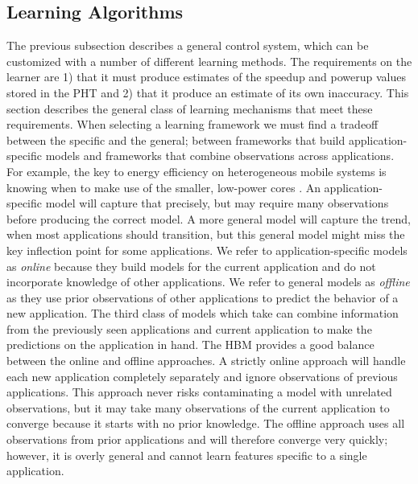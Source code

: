 \subsection{\SYSTEM{} Learning Algorithms}
The previous subsection describes a general control system, which can
be customized with a number of different learning methods.  The
requirements on the learner are 1) that it must produce estimates of
the speedup and powerup values stored in the PHT and 2) that it
produce an estimate of its own inaccuracy. 
This section describes the
general class of learning mechanisms that meet these requirements. When selecting a learning framework we must find a tradeoff between
the specific and the general; \ie between frameworks that build
application-specific models and frameworks that combine observations
across applications.  For example, the key to energy efficiency on
heterogeneous mobile systems is knowing when to make use of the
smaller, low-power cores \cite{}.  An application-specific model will
capture that precisely, but may require many observations before
producing the correct model.  A more general model will capture the
trend, \eg when most applications should transition, but this general
model might miss the key inflection point for some applications.  We
refer to application-specific models as \emph{online} because they
build models for the current application and do not incorporate
knowledge of other applications.  We refer to general models as
\emph{offline} as they use prior observations of other applications to
predict the behavior of a new application. The third class of models which take 
can combine information from the previously seen applications and current application to make the predictions on the application in hand. The HBM provides a good balance between the online and offline
approaches.   A strictly online approach will handle each new
application completely separately and ignore observations of previous
applications.  This approach never risks contaminating a model with
unrelated observations, but it may take many observations of the
current application to converge because it starts with no prior
knowledge. The offline approach uses all observations from prior
applications and will therefore converge very quickly; however, it is
overly general and cannot learn features specific to a single
application.

